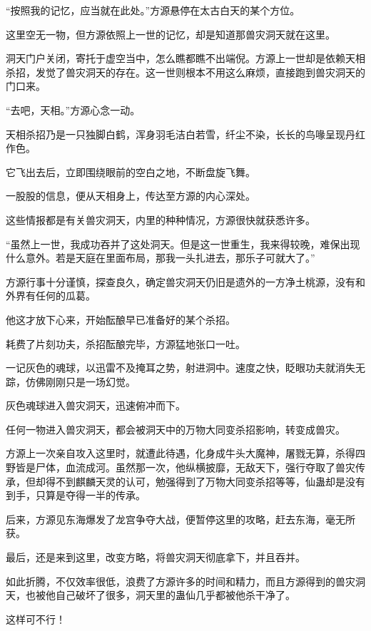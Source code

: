 
\begin{this_body}

“按照我的记忆，应当就在此处。”方源悬停在太古白天的某个方位。

这里空无一物，但方源依照上一世的记忆，却是知道那兽灾洞天就在这里。

洞天门户关闭，寄托于虚空当中，怎么瞧都瞧不出端倪。方源上一世却是依赖天相杀招，发觉了兽灾洞天的存在。这一世则根本不用这么麻烦，直接跑到兽灾洞天的门口来。

“去吧，天相。”方源心念一动。

天相杀招乃是一只独脚白鹤，浑身羽毛洁白若雪，纤尘不染，长长的鸟喙呈现丹红作色。

它飞出去后，立即围绕眼前的空白之地，不断盘旋飞舞。

一股股的信息，便从天相身上，传达至方源的内心深处。

这些情报都是有关兽灾洞天，内里的种种情况，方源很快就获悉许多。

“虽然上一世，我成功吞并了这处洞天。但是这一世重生，我来得较晚，难保出现什么意外。若是天庭在里面布局，那我一头扎进去，那乐子可就大了。”

方源行事十分谨慎，探查良久，确定兽灾洞天仍旧是遗外的一方净土桃源，没有和外界有任何的瓜葛。

他这才放下心来，开始酝酿早已准备好的某个杀招。

耗费了片刻功夫，杀招酝酿完毕，方源猛地张口一吐。

一记灰色的魂球，以迅雷不及掩耳之势，射进洞中。速度之快，眨眼功夫就消失无踪，仿佛刚刚只是一场幻觉。

灰色魂球进入兽灾洞天，迅速俯冲而下。

任何一物进入兽灾洞天，都会被洞天中的万物大同变杀招影响，转变成兽灾。

方源上一次亲自攻入这里时，就遭此待遇，化身成牛头大魔神，屠戮无算，杀得四野皆是尸体，血流成河。虽然那一次，他纵横披靡，无敌天下，强行夺取了兽灾传承，但却得不到麒麟天灵的认可，勉强得到了万物大同变杀招等等，仙蛊却是没有到手，只算是夺得一半的传承。

后来，方源见东海爆发了龙宫争夺大战，便暂停这里的攻略，赶去东海，毫无所获。

最后，还是来到这里，改变方略，将兽灾洞天彻底拿下，并且吞并。

如此折腾，不仅效率很低，浪费了方源许多的时间和精力，而且方源得到的兽灾洞天，也被他自己破坏了很多，洞天里的蛊仙几乎都被他杀干净了。

这样可不行！


\end{this_body}
